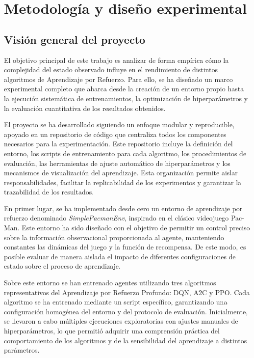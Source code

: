 \chapter{Metodología y diseño experimental}

\section{Visión general del proyecto}

El objetivo principal de este trabajo es analizar de forma empírica cómo la complejidad del estado observado influye en el rendimiento de distintos algoritmos de Aprendizaje por Refuerzo. Para ello, se ha diseñado un marco experimental completo que abarca desde la creación de un entorno propio hasta la ejecución sistemática de entrenamientos, la optimización de hiperparámetros y la evaluación cuantitativa de los resultados obtenidos.

El proyecto se ha desarrollado siguiendo un enfoque modular y reproducible, apoyado en un repositorio de código que centraliza todos los componentes necesarios para la experimentación. Este repositorio incluye la definición del entorno, los scripts de entrenamiento para cada algoritmo, los procedimientos de evaluación, las herramientas de ajuste automático de hiperparámetros y los mecanismos de visualización del aprendizaje. Esta organización permite aislar responsabilidades, facilitar la replicabilidad de los experimentos y garantizar la trazabilidad de los resultados.

En primer lugar, se ha implementado desde cero un entorno de aprendizaje por refuerzo denominado \textit{SimplePacmanEnv}, inspirado en el clásico videojuego Pac-Man. Este entorno ha sido diseñado con el objetivo de permitir un control preciso sobre la información observacional proporcionada al agente, manteniendo constantes las dinámicas del juego y la función de recompensa. De este modo, es posible evaluar de manera aislada el impacto de diferentes configuraciones de estado sobre el proceso de aprendizaje.

Sobre este entorno se han entrenado agentes utilizando tres algoritmos representativos del Aprendizaje por Refuerzo Profundo: DQN, A2C y PPO. Cada algoritmo se ha entrenado mediante un script específico, garantizando una configuración homogénea del entorno y del protocolo de evaluación. Inicialmente, se llevaron a cabo múltiples ejecuciones exploratorias con ajustes manuales de hiperparámetros, lo que permitió adquirir una comprensión práctica del comportamiento de los algoritmos y de la sensibilidad del aprendizaje a distintos parámetros.

